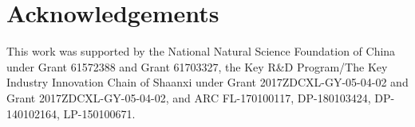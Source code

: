 \documentclass[10pt,twocolumn,letterpaper]{article}
\begin{document}
\section{Acknowledgements}
\vspace{-0.15cm}
\label{section: Acknowledgements}
This work was supported by the National Natural Science Foundation of China under Grant 61572388 and Grant 61703327, the Key R\&D Program/The Key Industry Innovation Chain of Shaanxi under Grant 2017ZDCXL-GY-05-04-02 and Grant 2017ZDCXL-GY-05-04-02, and ARC FL-170100117, DP-180103424, DP-140102164, LP-150100671.

{\small


}
\end{document}
